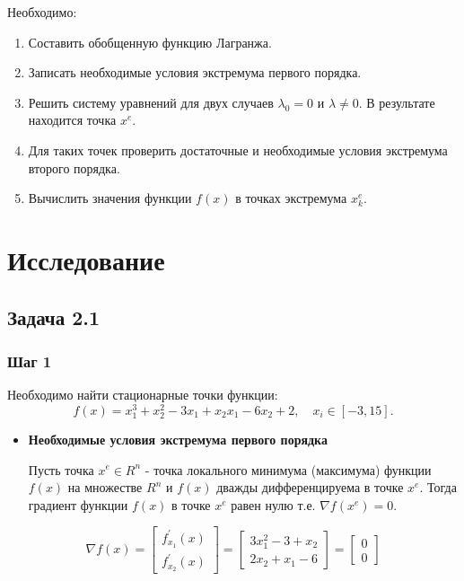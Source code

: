 \documentclass[a4paper, 12pt]{article}   	%
\begin{document}
    Необходимо:
    \begin{enumerate}
        \item Составить обобщенную функцию Лагранжа.
        \item Записать необходимые условия экстремума первого порядка.
        \item Решить систему уравнений для двух случаев $\lambda_0 = 0$ и $\lambda \neq 0$. В результате находится точка $x^e$.
        \item Для таких точек проверить достаточные и необходимые условия экстремума второго порядка.
        \item Вычислить значения функции $f(x)$ в точках экстремума $x^e_k$.

    \end{enumerate}

\newpage
\section{Исследование}
\subsection{Задача 2.1}

\subsubsection{Шаг 1}
    Необходимо найти стационарные точки функции:
    \begin{equation}
        f(x) = x^3_1 + x^2_2 - 3x_1 + x_2 x_1 - 6x_2 + 2, \quad x_i \in [-3, 15].
    \end{equation}
    
    \begin{itemize}
        \item \textbf{Необходимые условия экстремума первого порядка}
        
        Пусть точка $x^e \in R^n$ - точка локального минимума (максимума) функции $f(x)$ на множестве $R^n$ и $f(x)$ дважды дифференцируема в точке $x^e$. Тогда градиент функции $f(x)$ в точке $x^e$ равен нулю т.е. $\nabla f(x^e) = 0$. 		
    \end{itemize}
    
    \begin{equation}
        \nabla f(x) = 
        \left[
        \begin{array}{l}
            f^{\prime}_{x_1}(x) \\
            f^{\prime}_{x_2}(x)
        \end{array}
        \right]
        =
        \left[
        \begin{array}{l}
            3x^2_1 - 3 + x_2 \\
            2x_2 + x_1 - 6
        \end{array}
        \right]
        =
        \left[
        \begin{array}{l}
            0 \\
            0
        \end{array}
        \right]
    \end{equation}
    
\end{document}
